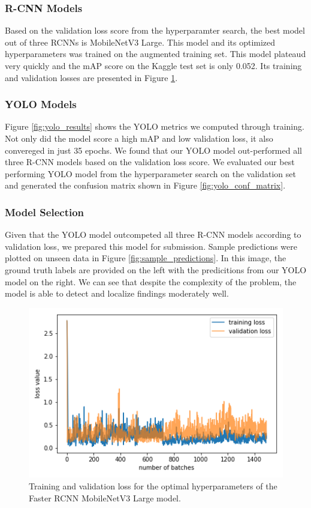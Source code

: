 \documentclass[conference]{IEEEtran}
\begin{document}
\subsubsection{R-CNN Models}
Based on the validation loss score from the hyperparamter search, the best model out of three RCNNs is MobileNetV3 Large. This model and its optimized hyperparameters was trained on the augmented training set. This model plateaud very quickly and the mAP score on the Kaggle test set is only 0.052. Its training and validation losses are presented in Figure \ref{fig:train_val_frcnn_optimal}.

\subsubsection{YOLO Models}
Figure \ref{fig:yolo_results} shows the YOLO metrics we computed through training. Not only did the model score a high mAP and low validation loss, it also convereged in just 35 epochs. We found that our YOLO model out-performed all three R-CNN models based on the validation loss score. We evaluated our best performing YOLO model from the hyperparameter search on the validation set and generated the confusion matrix shown in Figure \ref{fig:yolo_conf_matrix}.

\subsubsection{Model Selection}
Given that the YOLO model outcompeted all three R-CNN models according to validation loss, we prepared this model for submission. Sample predictions were plotted on unseen data in Figure \ref{fig:sample_predictions}. In this image, the ground truth labels are provided on the left with the predicitions from our YOLO model on the right. We can see that despite the complexity of the problem, the model is able to detect and localize findings moderately well. 

\begin{figure}[h]
	\centering
    \includegraphics[width=0.80\linewidth]{TrainValLossFrcnnMobilenet_v3_large_320_fpn}
    \caption{Training and validation loss for the optimal hyperparameters of the Faster RCNN MobileNetV3 Large model.}
	\label{fig:train_val_frcnn_optimal}
\end{figure}
\end{document}
